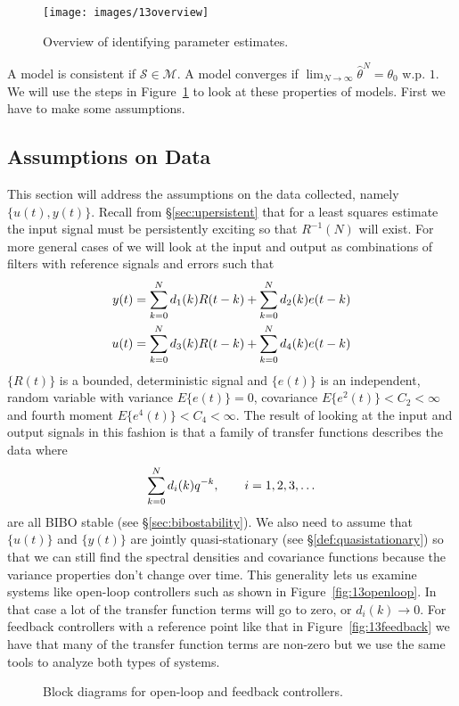 \begin{figure}[ht!]
\centering
\texttt{[image: images/13overview]}
\caption{Overview of identifying parameter estimates.}
\label{fig:13overview}
\end{figure}

A model is consistent if $\mathcal{S}\in\mathcal{M}$.
A model converges if $\lim_{N\to\infty}\hat{\theta}^N = \theta_0$ w.p. $1$.
We will use the steps in Figure~\ref{fig:13overview} to look at these properties of models.
First we have to make some assumptions.

\subsection{Assumptions on Data}
\label{sec:14data}
This section will address the assumptions on the data collected, namely $\{u(t),y(t)\}$.
Recall from \S\ref{sec:upersistent} that for a least squares estimate the input signal must be persistently exciting so that $R^{-1}(N)$ will exist.
For more general cases of we will look at the input and output as combinations of filters with reference signals and errors such that
\begin{align*}
y(t) &= \sum_{k=0}^N d_1(k)R(t-k) + \sum_{k=0}^N d_2(k)e(t-k) \\
u(t) &= \sum_{k=0}^N d_3(k)R(t-k) + \sum_{k=0}^N d_4(k)e(t-k)
\end{align*}
$\{R(t)\}$ is a bounded, deterministic signal and $\{e(t)\}$ is an independent, random variable with variance $E\{e(t)\} = 0$, covariance $E\{e^2(t)\}<C_2<\infty$ and fourth moment $E\{e^4(t)\}<C_4<\infty$.
The result of looking at the input and output signals in this fashion is that a family of transfer functions describes the data where
$$\sum_{k=0}^N d_i(k)q^{-k}, \qquad i=1,2,3,\ldots$$
are all BIBO stable (see \S\ref{sec:bibostability}).
We also need to assume that $\{u(t)\}$ and $\{y(t)\}$ are jointly quasi-stationary (see \S\ref{def:quasistationary}) so that we can still find the spectral densities and covariance functions because the variance properties don't change over time.
This generality lets us examine systems like open-loop controllers such as shown in Figure~\ref{fig:13openloop}.
In that case a lot of the transfer function terms will go to zero, or $d_i(k)\to0$.
For feedback controllers with a reference point like that in Figure~\ref{fig:13feedback} we have that many of the transfer function terms are non-zero but we use the same tools to analyze both types of systems.

\begin{figure}[ht!]
\centering
{} \hfill
{} \hfill
\caption{Block diagrams for open-loop and feedback controllers.}
\label{fig:13blocks}
\end{figure}

